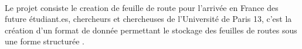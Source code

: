 

\paragraph{}

Le projet consiste le creation de feuille de route pour l’arrivée en France des future étudiant.es, chercheurs et chercheuses de l’Université de Paris 13, c’est la création d’un format de donnée permettant le stockage des feuilles de routes sous une forme structurée .


